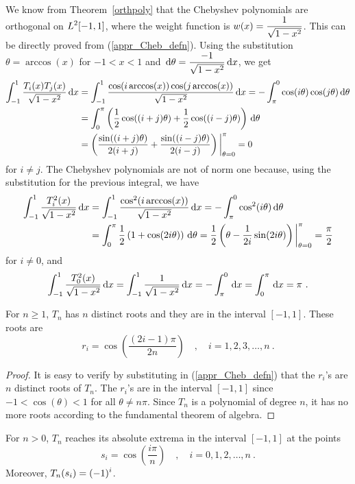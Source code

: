 We know from Theorem~\ref{orthpoly} that the Chebyshev polynomials are
orthogonal on $\displaystyle L^2[-1,1]$, where the weight function is
$\displaystyle w(x) = \frac{1}{\sqrt{1-x^2}}$.  This can be directly proved
from (\ref{appr_Cheb_defn}).  Using the substitution
$\theta= \arccos(x)$ for $-1<x<1$ and
$\displaystyle \,\mathrm{d}\theta = \frac{-1}{\sqrt{1-x^2}}\,\mathrm{d}x$, we get
\begin{align*}
\int_{-1}^1 \frac{T_i(x)T_j(x)}{\sqrt{1-x^2}} \,\mathrm{d}x &
= \int_{-1}^1 \frac{\cos(i\arccos(x))\cos(j\arccos(x))}{\sqrt{1-x^2}} \,\mathrm{d}x
= - \int_{\pi}^0 \cos(i\theta)\cos(j\theta) \,\mathrm{d}\theta \\
&= \int_0^\pi \left(\frac{1}{2}\cos((i+j)\theta) +
  \frac{1}{2}\cos((i-j)\theta) \right)\,\mathrm{d}\theta \\
&= \left(\frac{\sin((i+j)\theta)}{2(i+j)} +
  \frac{\sin((i-j)\theta)}{2(i-j)}\right) \bigg|_{\theta=0}^\pi
= 0
\end{align*}
for $i\neq j$.  The Chebyshev polynomials are not of norm one
because, using the substitution for the previous integral, we have
\begin{align*}
\int_{-1}^1 \frac{T_i^2(x)}{\sqrt{1-x^2}} \,\mathrm{d}x
&= \int_{-1}^1 \frac{\cos^2(i\arccos(x))}{\sqrt{1-x^2}} \,\mathrm{d}x
= - \int_{\pi}^0 \cos^2(i\theta) \,\mathrm{d}\theta \\
&= \int_0^\pi \frac{1}{2}\left(1+ \cos(2i\theta) \right)\,\mathrm{d}\theta
= \frac{1}{2} \left(\theta - \frac{1}{2i}\sin(2i\theta)
\right)\bigg|_{\theta=0}^\pi = \frac{\pi}{2}
\end{align*}
for  $i\neq 0$, and
\[
\int_{-1}^1 \frac{T_0^2(x)}{\sqrt{1-x^2}} \,\mathrm{d}x
= \int_{-1}^1 \frac{1}{\sqrt{1-x^2}} \,\mathrm{d}x = - \int_\pi^0 \,\mathrm{d}x
= \int_0^\pi \,\mathrm{d}x = \pi \  .
\]

\begin{prop}
For $n\geq 1$, $T_n$ has $n$ distinct roots and they are in the interval
$[-1,1]$.  These roots are
\[
r_i = \cos\left( \frac{(2i-1)\pi}{2n}\right) \quad , \quad
i=1,2,3,\ldots,n \ .
\]
\end{prop}

\begin{proof}
It is easy to verify by substituting in (\ref{appr_Cheb_defn}) that the
$r_i$'s are $n$ distinct roots of $T_n$.  The $r_i$'s are in the interval
$[-1,1]$ since $-1<\cos(\theta)<1$ for all $\theta \neq n\pi$.  Since $T_n$
is a polynomial of degree $n$, it has no more roots according to the
fundamental theorem of algebra.
\end{proof}

\begin{prop}
For $n>0$, $T_n$ reaches its absolute extrema in the interval $[-1,1]$ at the
points
\[
s_i = \cos\left(\frac{i\pi}{n}\right) \quad , \quad i=0,1,2,\ldots, n \ .
\]
Moreover, $\displaystyle T_n(s_i) = (-1)^i$.
\end{prop}

